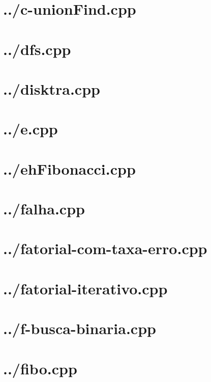 \documentclass{article}
\begin{document}
\section*{../c-unionFind.cpp}


\section*{../dfs.cpp}


\section*{../disktra.cpp}


\section*{../e.cpp}


\section*{../ehFibonacci.cpp}


\section*{../falha.cpp}


\section*{../fatorial-com-taxa-erro.cpp}


\section*{../fatorial-iterativo.cpp}


\section*{../f-busca-binaria.cpp}


\section*{../fibo.cpp}

\end{document}
